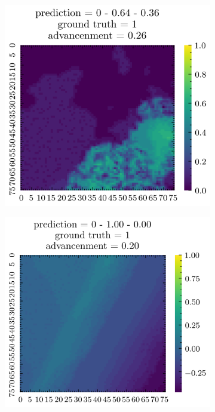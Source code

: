 \documentclass[../document.tex]{subfiles}
\begin{document}
\begin{figure}[H]
    \centering
    \begin{subfigure}[b]{0.19\textwidth}
        \includegraphics[width=\linewidth]{../img/5/quarry/false_positive/patch-2d-0.png}
    \end{subfigure}
    \begin{subfigure}[b]{0.19\textwidth}
        \includegraphics[width=\linewidth]{../img/5/quarry/false_positive/patch-2d-1.png}

\end{subfigure}
\end{figure}
\end{document}
